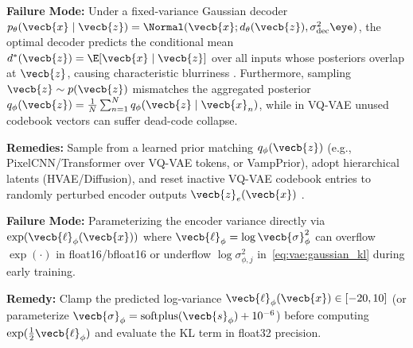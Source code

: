\documentclass[../../../../master.tex]{subfiles}
\begin{document}
\begin{pitfall}
\textbf{Failure Mode:} Under a fixed-variance Gaussian decoder $p_\theta(\vecb{x}\mid\vecb{z}) = \Normal(\vecb{x}; d_\theta(\vecb{z}), \sigma_{\mathrm{dec}}^2\eye)$, the optimal decoder predicts the conditional mean $d^*(\vecb{z}) = \E[\vecb{x} \mid \vecb{z}]$ over all inputs whose posteriors overlap at $\vecb{z}$, causing characteristic blurriness  . Furthermore, sampling $\vecb{z} \sim p(\vecb{z})$ mismatches the aggregated posterior $q_\phi(\vecb{z}) = \frac{1}{N}\sum_{n=1}^N q_\phi(\vecb{z}\mid\vecb{x}_n)$, while in VQ-VAE unused codebook vectors can suffer dead-code collapse.

\textbf{Remedies:} Sample from a learned prior matching $q_\phi(\vecb{z})$ (e.g., PixelCNN/Transformer over VQ-VAE tokens, or VampPrior), adopt hierarchical latents (HVAE/Diffusion), and reset inactive VQ-VAE codebook entries to randomly perturbed encoder outputs $\vecb{z}_e(\vecb{x})$  .
\end{pitfall}

\begin{pitfall}
\textbf{Failure Mode:} Parameterizing the encoder variance directly via $\exp(\vecb{\ell}_\phi(\vecb{x}))$ where $\vecb{\ell}_\phi = \log \vecb{\sigma}_\phi^2$ can overflow $\exp(\cdot)$ in float16/bfloat16 or underflow $\log \sigma_{\phi,j}^2$ in~\eqref{eq:vae:gaussian_kl} during early training.

\textbf{Remedy:} Clamp the predicted log-variance $\vecb{\ell}_\phi(\vecb{x}) \in [-20, 10]$ (or parameterize $\vecb{\sigma}_\phi = \operatorname{softplus}(\vecb{s}_\phi) + 10^{-6}$) before computing $\exp(\tfrac{1}{2}\vecb{\ell}_\phi)$ and evaluate the KL term in float32 precision.
\end{pitfall}
\end{document}
